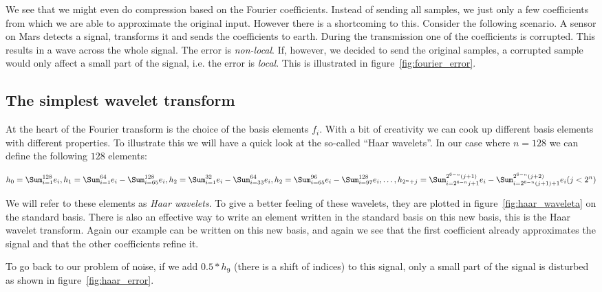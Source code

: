 
We see that we might even do compression based on the Fourier coefficients. Instead of sending all samples, we just only a few coefficients from which we are able to approximate the original input. However there is a shortcoming to this. Consider the following scenario. A sensor on Mars detects a signal, transforms it and sends the coefficients to earth. During the transmission one of the coefficients is corrupted. This results in a wave across the whole signal. The error is \emph{non-local}. If, however, we decided to send the original samples, a corrupted sample would only affect a small part of the signal, i.e. the error is \emph{local}. This is illustrated in figure~\ref{fig:fourier_error}.



\subsection{The simplest wavelet transform}
At the heart of the Fourier transform is the choice of the basis elements $f_i$. With a bit of creativity we can cook up different basis elements with different properties. To illustrate this we will have a quick look at the so-called ``Haar wavelets''. In our case where $n=128$ we can define the following $128$ elements:

$$ h_0 = \Sum_{i=1}^{128} e_i,
	h_1 = \Sum_{i=1}^{64} e_i - \Sum_{i=65}^{128} e_i,
	h_2 = \Sum_{i=1}^{32} e_i - \Sum_{i=33}^{64} e_i,
	h_2 = \Sum_{i=65}^{96} e_i - \Sum_{i=97}^{128} e_i, \ldots,
	h_{2^n + j} = \Sum_{i=2^{6-n}j+1}^{2^{6-n}(j+1)} e_i - \Sum_{i=2^{6-n}(j+1)+1}^{2^{6-n}(j+2)} e_i (j < 2^n) $$

We will refer to these elements as \emph{Haar wavelets}. To give a better feeling of these wavelets, they are plotted in figure~\ref{fig:haar_waveleta} on the standard basis. There is also an effective way to write an element written in the standard basis on this new basis, this is the Haar wavelet transform. Again our example can be written on this new basis, and again we see that the first coefficient already approximates the signal and that the other coefficients refine it.

To go back to our problem of noise, if we add $0.5*h_9$ (there is a shift of indices) to this signal, only a small part of the signal is disturbed as shown in figure~\ref{fig:haar_error}.


